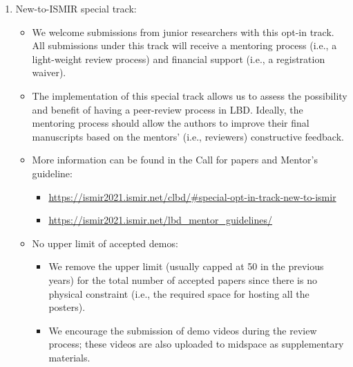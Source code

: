 \documentclass[%
10pt,								%
titlepage,						%
]
{scrartcl}
\begin{document}
            \begin{enumerate}
                \item New-to-ISMIR special track:
                    \begin{itemize}
                        \item We welcome submissions from junior researchers with this opt-in track. All submissions under this track will receive a mentoring process (i.e., a light-weight review process) and financial support (i.e., a registration waiver).

                        \item   The implementation of this special track allows us to assess the possibility and benefit of having a peer-review process in LBD. Ideally, the mentoring process should allow the authors to improve their final manuscripts based on the mentors' (i.e., reviewers) constructive feedback.  
                        \item   More information can be found in the Call for papers and Mentor's guideline: 
                            \begin{itemize}
                                \item \href{https://ismir2021.ismir.net/clbd/#special-opt-in-track-new-to-ismir}{https://ismir2021.ismir.net/clbd/\#special-opt-in-track-new-to-ismir}
                                \item \href{https://ismir2021.ismir.net/lbd_mentor_guidelines/}{https://ismir2021.ismir.net/lbd\_mentor\_guidelines/}
                            \end{itemize}

                        \item   No upper limit of accepted demos: 
                            \begin{itemize}
                                \item We remove the upper limit (usually capped at 50 in the previous years) for the total number of accepted papers since there is no physical constraint (i.e., the required space for hosting all the posters).

                                \item   We encourage the submission of demo videos during the review process; these videos are also uploaded to midspace as supplementary materials. 
                            \end{itemize}
                    \end{itemize}
            \end{enumerate}
\end{document}
